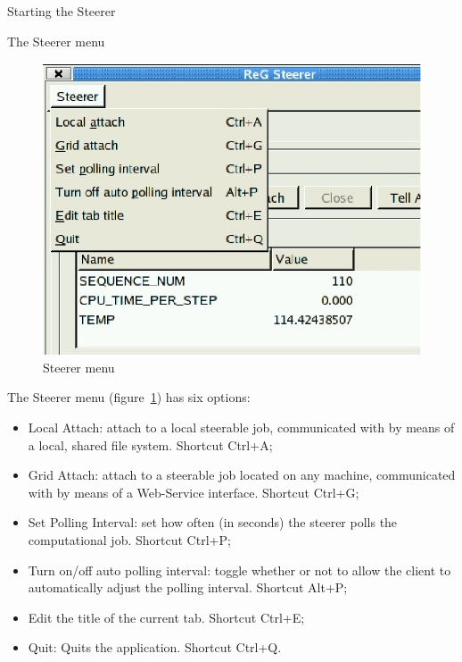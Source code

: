 \documentclass[a4paper,twoside]{article}
\begin{document}
\begin{section}{Starting the Steerer}

\begin{subsection}{The Steerer menu}


\begin{figure}
\centerline{\includegraphics{steerer_menu.eps}}
\caption{Steerer menu}
\label{fig:steerer_menu}
\end{figure}

The Steerer menu (figure~\ref{fig:steerer_menu}) has six options:
\begin{itemize}
\item Local Attach: attach to a local steerable job,
communicated with by means of a local, shared file system.
Shortcut Ctrl+A;
\item Grid Attach: attach to a steerable job located on
any machine, communicated with by means of a Web-Service
interface. Shortcut Ctrl+G;
\item Set Polling Interval: set how often (in seconds) the
steerer polls the computational job. Shortcut Ctrl+P;
\item Turn on/off auto polling interval: toggle whether or not
to allow the client to automatically adjust the polling
interval. Shortcut Alt+P;
\item Edit the title of the current tab. Shortcut Ctrl+E;
\item Quit: Quits the application. Shortcut Ctrl+Q.
\end{itemize}


\end{subsection}
\end{section}
\end{document}
